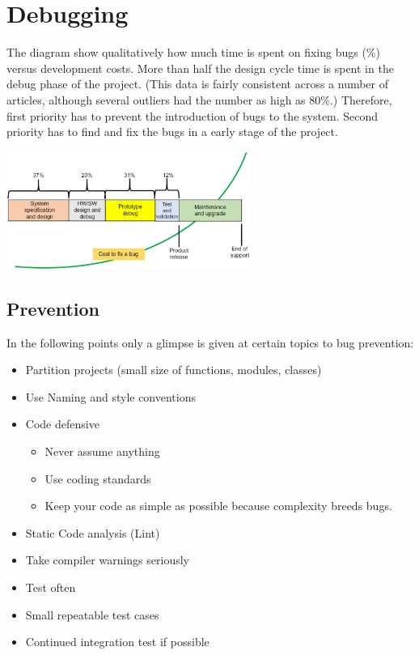 \section{Debugging}
The diagram show qualitatively how much time is spent on fixing bugs (\%) versus development costs.
More than half the design cycle time is spent in the debug phase of the project.
(This data is fairly consistent across a number of articles, although several outliers had the number as high as 80\%.)
Therefore, first priority has to prevent the introduction of bugs to the system.
Second priority has to find and fix the bugs in a early stage of the project.

\includegraphics[width=0.6\textwidth]{images/Debugging/bugs_vs_cost}

\subsection{Prevention}
In the following points only a glimpse is given at certain topics to bug prevention:
\begin{itemize}
    \item Partition projects (small size of functions, modules, classes)
    \item Use Naming and style conventions
    \item Code defensive
          \begin{itemize}
              \item Never assume anything
              \item Use coding standards
              \item Keep your code as simple as possible because complexity breeds bugs.
          \end{itemize}
    \item Static Code analysis (Lint)
    \item Take compiler warnings seriously
    \item Test often
    \item Small repeatable test cases
    \item Continued integration test if possible
\end{itemize}

